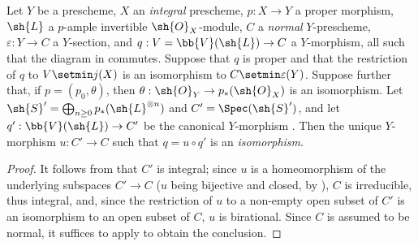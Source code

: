 \begin{proposition}[8.11.7]
\label{II.8.11.7}
Let $Y$ be a prescheme, $X$ an \emph{integral} prescheme, $p:X\to Y$ a proper morphism, $\sh{L}$ a $p$-ample invertible $\sh{O}_X$-module, $C$ a \emph{normal} $Y$-prescheme, $\varepsilon:Y\to C$ a $Y$-section, and $q:V=\bb{V}(\sh{L})\to C$ a $Y$-morphism, all such that the diagram in  commutes.
Suppose that $q$ is proper and that the restriction of $q$ to $V\setmin j(X)$ is an isomorphism to $C\setmin\varepsilon(Y)$.
Suppose further that, if $p=(p_0,\theta)$, then $\theta:\sh{O}_Y\to p_*(\sh{O}_X)$ is an isomorphism.
Let $\sh{S}'=\bigoplus_{n\geq0}p_*(\sh{L}^{\otimes n})$ and $C'=\Spec(\sh{S}')$, and let $q':\bb{V}(\sh{L})\to C'$ be the canonical $Y$-morphism .
Then the unique $Y$-morphism $u:C'\to C$ such that $q=u\circ q'$ is an \emph{isomorphism}.
\end{proposition}

\begin{proof}
It follows from  that $C'$ is integral;
since $u$ is a homeomorphism of the underlying subspaces $C'\to C$ ($u$ being bijective and closed, by ), $C$ is irreducible, thus integral, and, since the restriction of $u$ to a non-empty open subset of $C'$ is an isomorphism to an open subset of $C$, $u$ is birational.
Since $C$ is assumed to be normal, it suffices to apply  to obtain the conclusion.
\end{proof}

